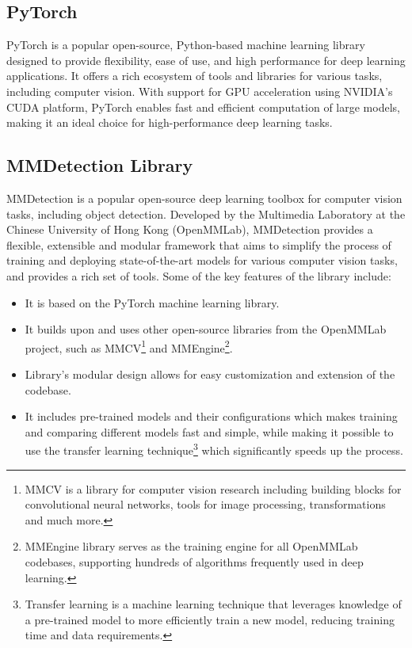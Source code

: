 \subsection{PyTorch}

PyTorch \cite{PyTorch} is a popular open-source, Python-based machine learning
library designed to provide flexibility, ease of use, and high performance for
deep learning applications. It offers a rich ecosystem of tools and libraries for
various tasks, including computer vision. With support for GPU acceleration
using NVIDIA's CUDA platform, PyTorch enables fast and efficient computation of
large models, making it an ideal choice for high-performance deep learning
tasks.

\subsection{MMDetection Library}

MMDetection \cite{MMDetection} is a popular open-source deep learning toolbox
for computer vision tasks, including object detection. Developed by the
Multimedia Laboratory at the Chinese University of Hong Kong (OpenMMLab),
MMDetection provides a flexible, extensible and modular framework that aims to
simplify the process of training and deploying state-of-the-art models for
various computer vision tasks, and provides a rich set of tools. Some of the key
features of the library include:

\begin{itemize}
    \item It is based on the PyTorch machine learning library.
    \item It builds upon and uses other open-source libraries from the OpenMMLab
    project, such as MMCV\footnote{MMCV is a library for computer vision
    research including building blocks for convolutional neural networks, tools
    for image processing, transformations and much more.} and
    MMEngine\footnote{MMEngine library serves as the training engine for all
    OpenMMLab codebases, supporting hundreds of algorithms frequently used in
    deep learning.}.
    \item Library's modular design allows for easy customization and extension
    of the codebase.
    \item It includes pre-trained models and their configurations which makes
    training and comparing different models fast and simple, while making it
    possible to use the transfer learning technique\footnote{Transfer learning
    is a machine learning technique that leverages knowledge of a pre-trained
    model to more efficiently train a new model, reducing training time and data
    requirements.} which significantly speeds up the process.
\end{itemize}


